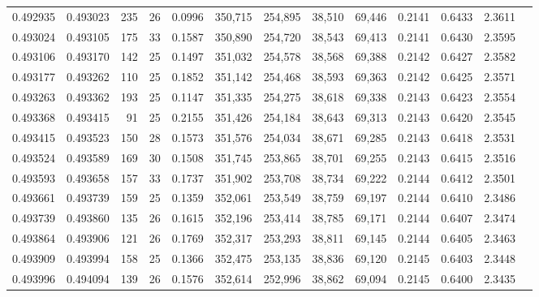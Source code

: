 \begin{tabular}{rrrrrrrrrrrrr}
0.492935 & 0.493023 & 235 &  26 &                                     0.0996 & 350,715 & 254,895 &  38,510 &  69,446 & 0.2141 & 0.6433 & 2.3611 \\
0.493024 & 0.493105 & 175 &  33 &                                     0.1587 & 350,890 & 254,720 &  38,543 &  69,413 & 0.2141 & 0.6430 & 2.3595 \\
0.493106 & 0.493170 & 142 &  25 &                                     0.1497 & 351,032 & 254,578 &  38,568 &  69,388 & 0.2142 & 0.6427 & 2.3582 \\
0.493177 & 0.493262 & 110 &  25 &                                     0.1852 & 351,142 & 254,468 &  38,593 &  69,363 & 0.2142 & 0.6425 & 2.3571 \\
0.493263 & 0.493362 & 193 &  25 &                                     0.1147 & 351,335 & 254,275 &  38,618 &  69,338 & 0.2143 & 0.6423 & 2.3554 \\
0.493368 & 0.493415 &  91 &  25 &                                     0.2155 & 351,426 & 254,184 &  38,643 &  69,313 & 0.2143 & 0.6420 & 2.3545 \\
0.493415 & 0.493523 & 150 &  28 &                                     0.1573 & 351,576 & 254,034 &  38,671 &  69,285 & 0.2143 & 0.6418 & 2.3531 \\
0.493524 & 0.493589 & 169 &  30 &                                     0.1508 & 351,745 & 253,865 &  38,701 &  69,255 & 0.2143 & 0.6415 & 2.3516 \\
0.493593 & 0.493658 & 157 &  33 &                                     0.1737 & 351,902 & 253,708 &  38,734 &  69,222 & 0.2144 & 0.6412 & 2.3501 \\
0.493661 & 0.493739 & 159 &  25 &                                     0.1359 & 352,061 & 253,549 &  38,759 &  69,197 & 0.2144 & 0.6410 & 2.3486 \\
0.493739 & 0.493860 & 135 &  26 &                                     0.1615 & 352,196 & 253,414 &  38,785 &  69,171 & 0.2144 & 0.6407 & 2.3474 \\
0.493864 & 0.493906 & 121 &  26 &                                     0.1769 & 352,317 & 253,293 &  38,811 &  69,145 & 0.2144 & 0.6405 & 2.3463 \\
0.493909 & 0.493994 & 158 &  25 &                                     0.1366 & 352,475 & 253,135 &  38,836 &  69,120 & 0.2145 & 0.6403 & 2.3448 \\
0.493996 & 0.494094 & 139 &  26 &                                     0.1576 & 352,614 & 252,996 &  38,862 &  69,094 & 0.2145 & 0.6400 & 2.3435 \\

\end{tabular}
